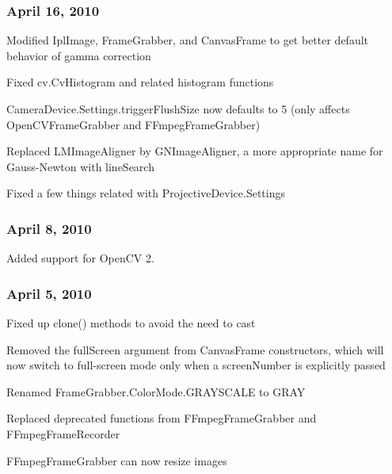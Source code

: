 \subsubsection*{April 16, 2010}


\begin{DoxyItemize}
\item Modified {\ttfamily Ipl\+Image}, {\ttfamily Frame\+Grabber}, and {\ttfamily Canvas\+Frame} to get better default behavior of gamma correction
\item Fixed {\ttfamily cv.\+Cv\+Histogram} and related histogram functions
\item {\ttfamily Camera\+Device.\+Settings.\+trigger\+Flush\+Size} now defaults to 5 (only affects {\ttfamily Open\+C\+V\+Frame\+Grabber} and {\ttfamily F\+Fmpeg\+Frame\+Grabber})
\item Replaced {\ttfamily L\+M\+Image\+Aligner} by {\ttfamily G\+N\+Image\+Aligner}, a more appropriate name for Gauss-\/\+Newton with {\ttfamily line\+Search}
\item Fixed a few things related with {\ttfamily Projective\+Device.\+Settings}
\end{DoxyItemize}

\subsubsection*{April 8, 2010}


\begin{DoxyItemize}
\item Added support for Open\+C\+V 2.
\end{DoxyItemize}

\subsubsection*{April 5, 2010}


\begin{DoxyItemize}
\item Fixed up {\ttfamily clone()} methods to avoid the need to cast
\item Removed the {\ttfamily full\+Screen} argument from {\ttfamily Canvas\+Frame} constructors, which will now switch to full-\/screen mode only when a {\ttfamily screen\+Number} is explicitly passed
\item Renamed {\ttfamily Frame\+Grabber.\+Color\+Mode.\+G\+R\+A\+Y\+S\+C\+A\+L\+E} to {\ttfamily G\+R\+A\+Y}
\item Replaced deprecated functions from {\ttfamily F\+Fmpeg\+Frame\+Grabber} and {\ttfamily F\+Fmpeg\+Frame\+Recorder}
\item {\ttfamily F\+Fmpeg\+Frame\+Grabber} can now resize images
\end{DoxyItemize}

